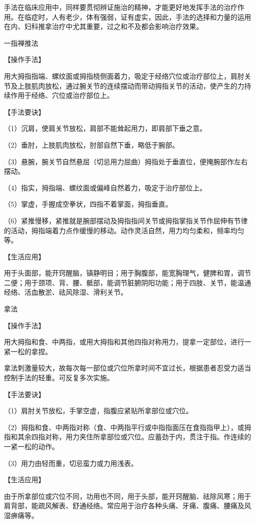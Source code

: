\documentclass[12pt,UTF8,openany]{ctexbook}
\begin{document}
手法在临床应用中，同样要贯彻辨证施治的精神，才能更好地发挥手法的治疗作用。在临症时，人有老少，体有强弱，证有虚实，因此，手法的选择和力量的运用在内、妇科推拿治疗中尤其重要，过之和不及都会影响治疗效果。

一指禅推法

【操作手法】

用大拇指指端、螺纹面或拇指桡侧面着力，吸定于经络穴位或治疗部位上，肩肘关节及上肢肌肉放松，通过腕关节的连续摆动而带动拇指关节的活动，使产生的力持续作用于经络、穴位或治疗部位上。

【手法要诀】

（1）沉肩，使肩关节放松，肩部不能耸起用力，即肩部下垂之意。

（2）垂肘，上肢肌肉放松，肘部自然下垂，略低于腕部。

（3）悬腕，腕关节自然悬屈（切忌用力屈曲）拇指处于垂直位，便掩腕部作左右摆动。

（4）指实，拇指端、螺纹面或偏峰自然着力，吸定于治疗部位上。

（5）掌虚，手握成空拳状，四指不着掌面，拇指垂直。

（6）紧推慢移，紧推就是腕部摆动及拇指指间关节或拇指掌指关节作屈伸有节律的活动，拇指端着力点作缓慢的移动。动作灵活自然，用力均匀柔和，频率均匀等。

【生活应用】

用于头面部，能开窍醒脑，镇静明目；用于胸腹部，能宽胸理气，健脾和胃，调节二便；用于颈项、背、腰、骶部，能调节脏腑阴阳功能；用于四肢、关节，能温通经络、活血散淤、祛风除湿、滑利关节。

拿法

【操作手法】

用大拇指和食、中两指，或用大拇指和其他四指对称用力，提拿一定部位，进行一紧一松的拿捏。

拿法刺激量较大，故每次每一部位或穴位所拿时间不宜过长，根据患者忍受力适当控制手法的轻重。可反复多次实施。

【手法要诀】

（1）肩肘关节放松，手掌空虚，指腹应紧贴所拿部位或穴位。

（2）拇指和食、中两指对称（食、中两指平行或中指指面压在食指指甲上），或拇指和其余四指对称，用力夹住所拿部位或穴位。应蓄劲于内，贯注于指。作连续的一紧一松的动作。

（3）用力由轻而重，切忌蛮力或力用浅表。

【生活应用】

由于所拿部位或穴位不同，功用也不同，用于头部，能开窍醒脑、祛除风寒；用于肩背部，能疏风解表、舒通经络。常应用于治疗各种头痛、牙痛、腹痛、腰痛及风湿痹痛等。
\end{document}
